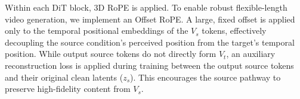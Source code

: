 Within each DiT block, 3D RoPE is applied. To enable robust flexible-length video generation, we implement an Offset RoPE. A large, fixed offset is applied only to the temporal positional embeddings of the $V_s$ tokens, effectively decoupling the source condition's perceived position from the target's temporal position. While output source tokens do not directly form $V_t$, an auxiliary reconstruction loss is applied during training between the output source tokens and their original clean latents ($z_s$). This encourages the source pathway to preserve high-fidelity content from $V_s$.





